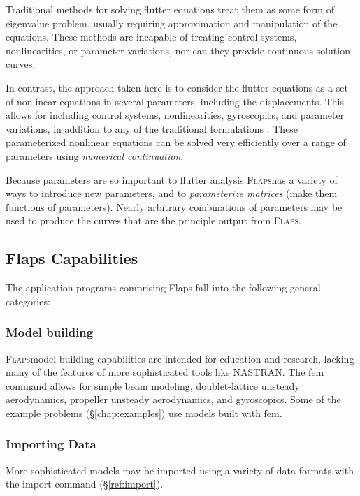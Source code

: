 \documentclass[11pt,openany,twoside]{book}
\numberwithin{equation}{section}		%
\newcommand{\Cmd}[1]{{\sf #1}}
\newcommand{\Newterm}[1]{{\em #1}}
\newcommand{\Flaps}{\textsc{Flaps\:}}
\newcommand{\Nastran}{{\footnotesize{NASTRAN\:}}}
\newcommand{\Sectref}[1]{\S\ref{#1}}
\begin{document}
Traditional methods for solving flutter equations treat them as
some form of eigenvalue problem, usually requiring approximation and
manipulation of the equations. These methods are incapable of treating
control systems, nonlinearities, or parameter variations, nor can they
provide continuous solution curves.

In contrast, the approach taken here is to consider the flutter equations as a
set of nonlinear equations in several parameters, including the displacements.
This allows for including control systems, nonlinearities, gyroscopics,
and parameter variations, in addition to any of the traditional
formulations \cite{demasi2024introduction}.
These parameterized nonlinear equations can be solved very efficiently
over a range of parameters using \Newterm{numerical continuation}.

Because parameters are so important to flutter analysis \Flaps has
a variety of ways to introduce new parameters, and to
\Newterm{parameterize matrices} (make them functions of parameters).
Nearly arbitrary combinations of parameters may be used to produce
the curves that are the principle output from \Flaps.


\subsection{Flaps Capabilities}
The application programs comprising Flaps fall into the following
general categories:

\subsubsection{Model building}
\Flaps model building capabilities are intended for education
and research, lacking many of the features of more sophisticated
tools like \Nastran.
The \Cmd{fem} command allows for simple beam modeling,
doublet-lattice unsteady aerodynamics, propeller unsteady
aerodynamics, and gyroscopics. Some of the example problems (\Sectref{chap:examples})
use models built with \Cmd{fem}.

\subsubsection{Importing Data}
More sophisticated models may be imported using a variety of
data formats with the \Cmd{import} command (\Sectref{ref:import}).
        
\end{document}
